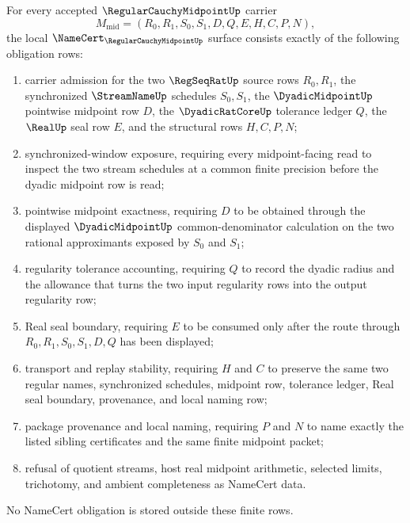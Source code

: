 \begin{theorem}
\label{thm:regular-cauchy-midpoint-namecert-obligations}
For every accepted $\RegularCauchyMidpointUp$ carrier
$$
M_{\mathrm{mid}}=(R_0,R_1,S_0,S_1,D,Q,E,H,C,P,N),
$$
the local $\NameCert_{\RegularCauchyMidpointUp}$ surface consists exactly of the following obligation rows:
\begin{enumerate}
\item carrier admission for the two $\RegSeqRatUp$ source rows $R_0,R_1$, the synchronized $\StreamNameUp$ schedules $S_0,S_1$, the $\DyadicMidpointUp$ pointwise midpoint row $D$, the $\DyadicRatCoreUp$ tolerance ledger $Q$, the $\RealUp$ seal row $E$, and the structural rows $H,C,P,N$;
\item synchronized-window exposure, requiring every midpoint-facing read to inspect the two stream schedules at a common finite precision before the dyadic midpoint row is read;
\item pointwise midpoint exactness, requiring $D$ to be obtained through the displayed $\DyadicMidpointUp$ common-denominator calculation on the two rational approximants exposed by $S_0$ and $S_1$;
\item regularity tolerance accounting, requiring $Q$ to record the dyadic radius and the allowance that turns the two input regularity rows into the output regularity row;
\item Real seal boundary, requiring $E$ to be consumed only after the route through $R_0,R_1,S_0,S_1,D,Q$ has been displayed;
\item transport and replay stability, requiring $H$ and $C$ to preserve the same two regular names, synchronized schedules, midpoint row, tolerance ledger, Real seal boundary, provenance, and local naming row;
\item package provenance and local naming, requiring $P$ and $N$ to name exactly the listed sibling certificates and the same finite midpoint packet;
\item refusal of quotient streams, host real midpoint arithmetic, selected limits, trichotomy, and ambient completeness as NameCert data.
\end{enumerate}
No NameCert obligation is stored outside these finite rows.
\end{theorem}
